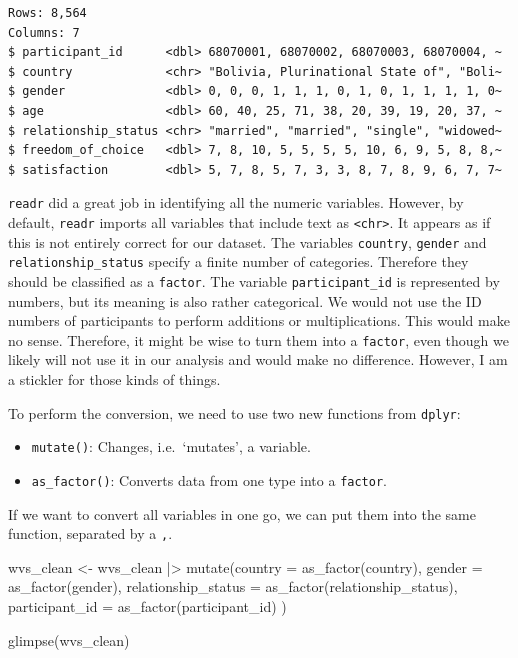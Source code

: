 \documentclass[
  letterpaper,
  DIV=11,
  numbers=noendperiod]{scrreprt}
\newenvironment{Shaded}{\begin{snugshade}}{\end{snugshade}}
\newcommand{\AttributeTok}[1]{\textcolor[rgb]{0.40,0.45,0.13}{#1}}
\newcommand{\FunctionTok}[1]{\textcolor[rgb]{0.28,0.35,0.67}{#1}}
\newcommand{\NormalTok}[1]{\textcolor[rgb]{0.00,0.23,0.31}{#1}}
\newcommand{\OtherTok}[1]{\textcolor[rgb]{0.00,0.23,0.31}{#1}}
\newcommand{\SpecialCharTok}[1]{\textcolor[rgb]{0.37,0.37,0.37}{#1}}
\begin{document}
\begin{verbatim}
Rows: 8,564
Columns: 7
$ participant_id      <dbl> 68070001, 68070002, 68070003, 68070004, ~
$ country             <chr> "Bolivia, Plurinational State of", "Boli~
$ gender              <dbl> 0, 0, 0, 1, 1, 1, 0, 1, 0, 1, 1, 1, 1, 0~
$ age                 <dbl> 60, 40, 25, 71, 38, 20, 39, 19, 20, 37, ~
$ relationship_status <chr> "married", "married", "single", "widowed~
$ freedom_of_choice   <dbl> 7, 8, 10, 5, 5, 5, 5, 10, 6, 9, 5, 8, 8,~
$ satisfaction        <dbl> 5, 7, 8, 5, 7, 3, 3, 8, 7, 8, 9, 6, 7, 7~
\end{verbatim}

\texttt{readr} did a great job in identifying all the numeric variables.
However, by default, \texttt{readr} imports all variables that include
text as \texttt{\textless{}chr\textgreater{}}. It appears as if this is
not entirely correct for our dataset. The variables \texttt{country},
\texttt{gender} and \texttt{relationship\_status} specify a finite
number of categories. Therefore they should be classified as a
\texttt{factor}. The variable \texttt{participant\_id} is represented by
numbers, but its meaning is also rather categorical. We would not use
the ID numbers of participants to perform additions or multiplications.
This would make no sense. Therefore, it might be wise to turn them into
a \texttt{factor}, even though we likely will not use it in our analysis
and would make no difference. However, I am a stickler for those kinds
of things.

To perform the conversion, we need to use two new functions from
\texttt{dplyr}:

\begin{itemize}
\item
  \texttt{mutate()}: Changes, i.e.~`mutates', a variable.
\item
  \texttt{as\_factor()}: Converts data from one type into a
  \texttt{factor}.
\end{itemize}

If we want to convert all variables in one go, we can put them into the
same function, separated by a \texttt{,}.

\begin{Shaded}
\begin{Highlighting}[]
\NormalTok{wvs\_clean }\OtherTok{\textless{}{-}}
\NormalTok{  wvs\_clean }\SpecialCharTok{|\textgreater{}}
  \FunctionTok{mutate}\NormalTok{(}\AttributeTok{country =} \FunctionTok{as\_factor}\NormalTok{(country),}
         \AttributeTok{gender =} \FunctionTok{as\_factor}\NormalTok{(gender),}
         \AttributeTok{relationship\_status =} \FunctionTok{as\_factor}\NormalTok{(relationship\_status),}
         \AttributeTok{participant\_id =} \FunctionTok{as\_factor}\NormalTok{(participant\_id)}
\NormalTok{         )}

\FunctionTok{glimpse}\NormalTok{(wvs\_clean)}
\end{Highlighting}
\end{Shaded}
\end{document}
